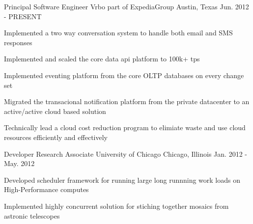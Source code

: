 


\begin{cventries}


\cventry
{Principal Software Engineer} %
{Vrbo part of ExpediaGroup} %
{Austin, Texas} %
{Jun. 2012 - PRESENT} %
{ %
\begin{cvitems}
\item {Implemented a two way conversation system to handle both email and SMS responses}
\item {Implemented and scaled the core data api platform to 100k+ tps}
\item {Implemented eventing platform from the core OLTP databases on every change set}
\item {Migrated the transacional notification platform from the private datacenter to an active/active cloud based solution}
\item {Technically lead a cloud cost reduction program to elimiate waste and use cloud resources efficiently and effectively}
\end{cvitems}
}


\cventry
{Developer Research Associate} %
{University of Chicago} %
{Chicago, Illinois} %
{Jan. 2012 - May. 2012} %
{ %
\begin{cvitems}
\item {Developed scheduler framework for running large long runnning work loads on High-Performance computes}
\item {Implemented highly concurrent solution for stiching together mosaics from astronic telescopes}
\end{cvitems}
}



\end{cventries}
